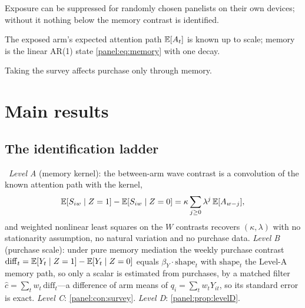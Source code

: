 \begin{assumption}
\label{panel:ass:random}
Exposure can be suppressed for randomly chosen panelists on their own devices; without it nothing below the memory contrast is identified.
\end{assumption}

\begin{assumption}
\label{panel:ass:path}
The exposed arm's expected attention path $\mathbb{E}[A_t]$ is known up to scale; memory is the linear AR(1) state \cref{panel:eq:memory} with one decay.
\end{assumption}

\begin{assumption}
\label{panel:ass:exclusion}
Taking the survey affects purchase only through memory.
\end{assumption}

\section{Main results}

\subsection{The identification ladder}

\begin{construction}
\label{panel:con:ladder}
\tagEstablished\ \emph{Level A} (memory kernel): the between-arm wave contrast is a convolution of the known attention path with the kernel,
\begin{equation}
\mathbb{E}[S_{iw} \mid Z = 1] - \mathbb{E}[S_{iw} \mid Z = 0] = \kappa \sum_{j \ge 0} \lambda^{j}\, \mathbb{E}[A_{w-j}],
\label{panel:eq:levelA}
\end{equation}
and weighted nonlinear least squares on the $W$ contrasts recovers $(\kappa, \lambda)$ with no stationarity assumption, no natural variation and no purchase data. \emph{Level B} (purchase scale): under pure memory mediation the weekly purchase contrast $\mathrm{diff}_t = \mathbb{E}[Y_t \mid Z = 1] - \mathbb{E}[Y_t \mid Z = 0]$ equals $\beta_Y \cdot \mathrm{shape}_t$ with $\mathrm{shape}_t$ the Level-A memory path, so only a scalar is estimated from purchases, by a matched filter $\hat c = \sum_t w_t\, \mathrm{diff}_t$---a difference of arm means of $q_i = \sum_t w_t Y_{it}$, so its standard error is exact. \emph{Level C}: \cref{panel:con:survey}. \emph{Level D}: \cref{panel:prop:levelD}.
\end{construction}

